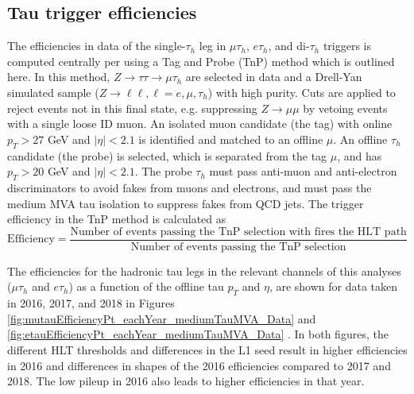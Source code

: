 \subsection{Tau trigger efficiencies}
The efficiencies in data of the single-$\tau_{h}$ leg in $\mu\tau_{h}$, $e\tau_{h}$, and di-$\tau_{h}$ triggers is computed centrally per using a Tag and Probe (TnP) method \cite{CMS-DP-2019-012} which is outlined here. In this method, $Z \rightarrow \tau\tau \rightarrow \mu\tau_{h}$ are selected in data and a Drell-Yan simulated sample ($Z \rightarrow \ell\ell, \ell = e, \mu, \tau_{h}$) with high purity. Cuts are applied to reject events not in this final state, e.g. suppressing $Z \rightarrow \mu\mu$ by vetoing events with a single loose ID muon. An isolated muon candidate (the tag) with online $p_{T} > 27$ GeV and $|\eta| < 2.1$ is identified and matched to an offline $\mu$. An offline $\tau_{h}$ candidate (the probe) is selected, which is separated from the tag $\mu$, and has $p_{T} > 20$ GeV and $|\eta| < 2.1$. The probe $\tau_{h}$ must pass anti-muon and anti-electron discriminators to avoid fakes from muons and electrons, and must pass the medium MVA tau isolation to suppress fakes from QCD jets. The trigger efficiency in the TnP method is calculated as 
\begin{equation}
    \text{Efficiency} = \frac{\text{Number of events passing the TnP selection with fires the HLT path}}{\text{Number of events passing the TnP selection}}
\end{equation}


The efficiencies for the hadronic tau legs in the relevant channels of this analyses ($\mu\tau_{h}$ and $e\tau_{h}$) as a function of the offline tau $p_{T}$ and $\eta$, are shown for data taken in 2016, 2017, and 2018 in Figures \ref{fig:mutauEfficiencyPt_eachYear_mediumTauMVA_Data} and \ref{fig:etauEfficiencyPt_eachYear_mediumTauMVA_Data} \cite{CMS-DP-2019-012} \cite{twiki_Tau_Lepton_Run_2_trigger_performance}. In both figures, the different HLT thresholds and differences in the L1 seed result in higher efficiencies in 2016 and differences in shapes of the 2016 efficiencies compared to 2017 and 2018. The low pileup in 2016 also leads to higher efficiencies in that year.


